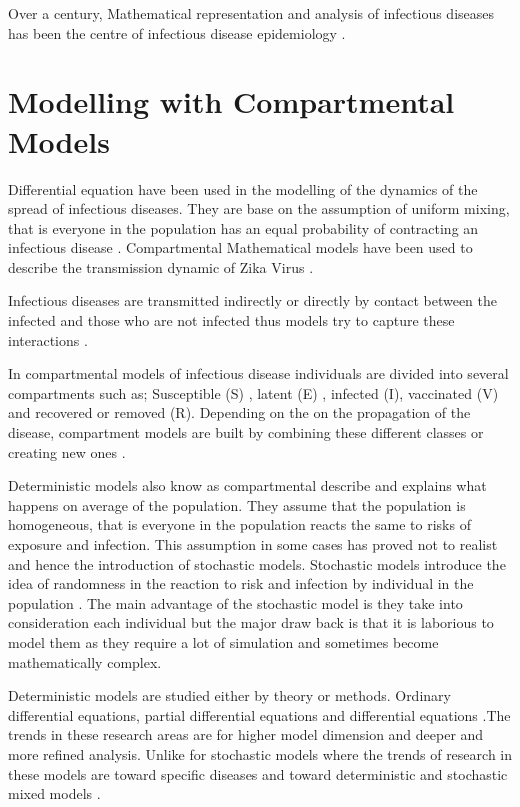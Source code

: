 Over a  century, Mathematical representation and analysis of infectious diseases has been the centre of  infectious disease epidemiology \citep{b2005}. 

\section{Modelling with Compartmental Models}

Differential equation have been used in the modelling of the dynamics of the spread of infectious diseases. They are base on the assumption of uniform mixing, that is everyone in the population has an equal probability of contracting an infectious disease \citep{kaplan2002emergency}.
Compartmental Mathematical models have been used to describe the transmission dynamic of Zika Virus \citep{gao2016}.


 Infectious diseases are transmitted indirectly  or directly by contact between the infected and those who are not infected thus models try to capture these interactions \citep{sat}. 
 
In compartmental models of infectious disease individuals are divided into  several compartments such as; Susceptible (S) , latent (E) , infected (I), vaccinated (V) and recovered or removed (R). Depending on the on the propagation of the disease, compartment models are built by combining these different classes or creating new ones \citep{li}.

 
 Deterministic models also know as compartmental describe and explains what happens on average of the population. They assume that the population is homogeneous, that is everyone in the population reacts the same to risks of exposure and infection. This assumption in some cases has proved not to realist and hence the introduction of stochastic models.  Stochastic models introduce the idea of randomness in the reaction to risk and infection by individual in the population \citep{ming2016stochastic}. The main advantage of the stochastic model is they take into consideration each individual but the major draw back is that it is laborious to model them as they require a lot of simulation and sometimes become mathematically complex.
 
 Deterministic models are studied either by theory or methods. Ordinary differential equations, partial differential equations and differential equations \citep{keeling2008modeling}.The trends in these research areas are for higher model dimension and deeper and more refined analysis. Unlike for stochastic models where the trends of research in these models are
toward specific diseases and toward deterministic and stochastic mixed models \citep{fu2013propagation}.


